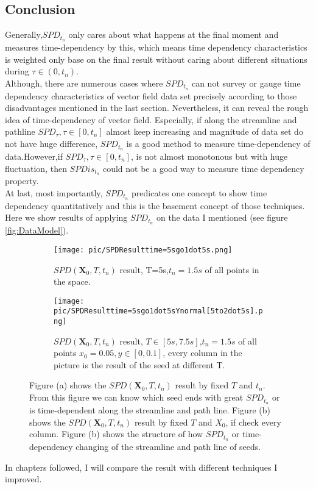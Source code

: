 \documentclass[
     11pt,         %
     a4paper,      %
     oneside,
     ]{article}
\newcommand{\vect}[1]{\boldsymbol{#1}}
\begin{document}
    \subsection{Conclusion}
    Generally,$SPD_{t_{n}}$ only cares about what happens at the final moment and measures time-dependency by this, which means time dependency characteristics is weighted only base on the final result without caring about different situations during $\tau \in(0,t_{n})$.\\
    Although, there are numerous cases where $SPD_{t_{n}}$ can not survey or gauge time dependency characteristics of vector field data set precisely according to those disadvantages mentioned in the last section. Nevertheless, it can reveal the rough idea of time-dependency of vector field. Especially, if along the streamline and pathline $SPD_{\tau}, \tau \in [0,t_{n}]$ almost keep increasing and magnitude of data set do not have huge difference, $SPD_{t_{n}}$ is a good method to measure time-dependency of data.However,if $SPD_{\tau}, \tau \in [0,t_{n}]$, is not almost monotonous but with huge fluctuation, then $SPDis_{t_{n}}$ could not be a good way to measure time dependency property.\\
    At last, most importantly, $SPD_{t_{n}}$ predicates one concept to show time dependency quantitatively and this is the basement concept of those techniques.
    Here we show results of applying $SPD_{t_{n}}$ on the data I mentioned (see figure \ref{fig:DataModel}).
    \begin{figure}[H]
        \begin{subfigure}{0.65\textwidth}
        	\centering
        	\texttt{[image: pic/SPDResulttime=5sgo1dot5s.png]}
        	\caption{$SPD(\vect{X}_{0},T,t_{n})$ result, T=5s,$t_{n}=1.5s$ of all points in the space.}
        	\label{fig:SPDResulttime=5sgo1dot5s}
       	\end{subfigure}
       	\begin{subfigure}{0.65\textwidth}
       		\centering
       		\texttt{[image: pic/SPDResulttime=5sgo1dot5sYnormal[5to2dot5s].png]}
       		\caption{ $SPD(\vect{X}_{0},T,t_{n})$ result, $T\in[5s,7.5s]$,$t_{n}=1.5s$ of all points $x_{0}=0.05,y\in[0,0.1]$, every column in the picture is the result of the seed at different T.}
       		\label{SPDResulttime=5sgo1dot5sYnormal[5to2dot5s]}
       	\end{subfigure}
        		\caption{ Figure (a) shows the $SPD(\vect{X}_{0},T,t_{n})$ result by fixed $T$ and $t_{n}$. From this figure we can know which seed ends with great $SPD_{t_{n}}$ or is time-dependent along the streamline and path line. Figure (b) shows the $SPD(\vect{X}_{0},T,t_{n})$ result by fixed $T$ and $X_{0}$, if check every column. Figure (b) shows the structure of how $SPD_{t_{n}}$ or time-dependency changing of the streamline and path line of seeds. }
        		\label{fig:SPDResult}
    \end{figure}
    In chapters followed, I will compare the result with different techniques I improved.
    
\end{document}
